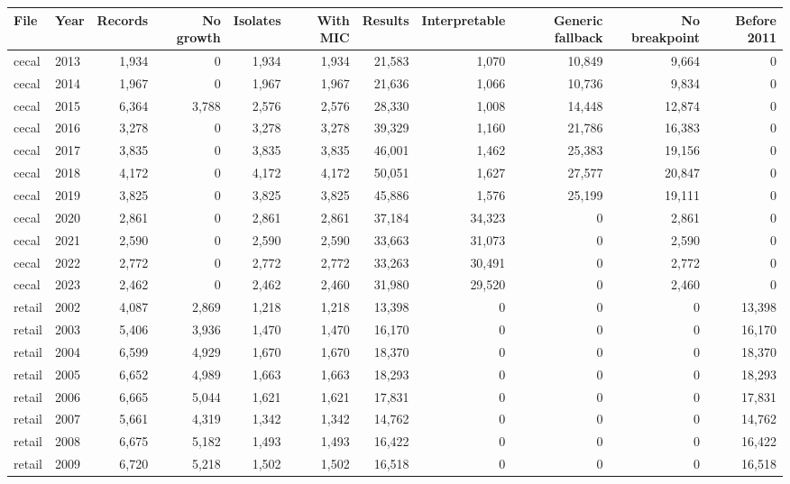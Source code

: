 \begin{table}[h]
\centering
\scriptsize
\begin{tabular}{llrrrrrrrrr}
\toprule
File & Year & Records & No growth & Isolates & With MIC & Results & Interpretable & Generic fallback & No breakpoint & Before 2011 \\
\midrule
cecal & 2013 & 1,934 & 0 & 1,934 & 1,934 & 21,583 & 1,070 & 10,849 & 9,664 & 0 \\
cecal & 2014 & 1,967 & 0 & 1,967 & 1,967 & 21,636 & 1,066 & 10,736 & 9,834 & 0 \\
cecal & 2015 & 6,364 & 3,788 & 2,576 & 2,576 & 28,330 & 1,008 & 14,448 & 12,874 & 0 \\
cecal & 2016 & 3,278 & 0 & 3,278 & 3,278 & 39,329 & 1,160 & 21,786 & 16,383 & 0 \\
cecal & 2017 & 3,835 & 0 & 3,835 & 3,835 & 46,001 & 1,462 & 25,383 & 19,156 & 0 \\
cecal & 2018 & 4,172 & 0 & 4,172 & 4,172 & 50,051 & 1,627 & 27,577 & 20,847 & 0 \\
cecal & 2019 & 3,825 & 0 & 3,825 & 3,825 & 45,886 & 1,576 & 25,199 & 19,111 & 0 \\
cecal & 2020 & 2,861 & 0 & 2,861 & 2,861 & 37,184 & 34,323 & 0 & 2,861 & 0 \\
cecal & 2021 & 2,590 & 0 & 2,590 & 2,590 & 33,663 & 31,073 & 0 & 2,590 & 0 \\
cecal & 2022 & 2,772 & 0 & 2,772 & 2,772 & 33,263 & 30,491 & 0 & 2,772 & 0 \\
cecal & 2023 & 2,462 & 0 & 2,462 & 2,460 & 31,980 & 29,520 & 0 & 2,460 & 0 \\
retail & 2002 & 4,087 & 2,869 & 1,218 & 1,218 & 13,398 & 0 & 0 & 0 & 13,398 \\
retail & 2003 & 5,406 & 3,936 & 1,470 & 1,470 & 16,170 & 0 & 0 & 0 & 16,170 \\
retail & 2004 & 6,599 & 4,929 & 1,670 & 1,670 & 18,370 & 0 & 0 & 0 & 18,370 \\
retail & 2005 & 6,652 & 4,989 & 1,663 & 1,663 & 18,293 & 0 & 0 & 0 & 18,293 \\
retail & 2006 & 6,665 & 5,044 & 1,621 & 1,621 & 17,831 & 0 & 0 & 0 & 17,831 \\
retail & 2007 & 5,661 & 4,319 & 1,342 & 1,342 & 14,762 & 0 & 0 & 0 & 14,762 \\
retail & 2008 & 6,675 & 5,182 & 1,493 & 1,493 & 16,422 & 0 & 0 & 0 & 16,422 \\
retail & 2009 & 6,720 & 5,218 & 1,502 & 1,502 & 16,518 & 0 & 0 & 0 & 16,518 \\

\end{tabular}
\end{table}
